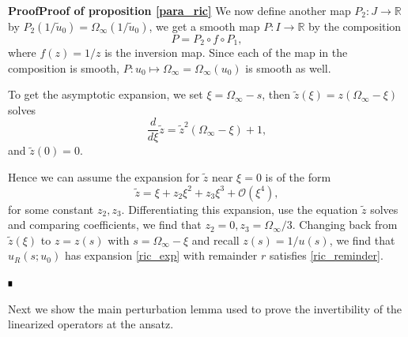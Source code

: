 \documentclass[letterpaper,11pt]{article}
\newcommand{\rmO}{\mathcal{O}}
\numberwithin{equation}{section}
\theoremstyle{plain}
\newenvironment{Proof}[1][.]%
 {\begin{trivlist}\item[]\textbf{Proof#1 }}%
 {\hspace*{\fill}$\rule{0.3\baselineskip}{0.35\baselineskip}$\end{trivlist}}
\begin{document}
\begin{Proof}[\textbf{Proof of proposition \ref{para_ric}}]
 We now define another map $P_2 : J \to \mathbb{R}$ by $P_2(1/\tilde{u}_0) = \Omega_\infty(1/\tilde{u}_0)$, we get a smooth map $P: I \to \mathbb{R}$ by the composition
 \[
 P =P_2 \circ f \circ P_1,
 \] 
 where $f(z) = 1/z$ is the inversion map. Since each of the map in the composition is smooth, $P: u_0 \mapsto \Omega_\infty = \Omega_\infty(u_0)$ is smooth as well.

To get the asymptotic expansion, we set $\xi = \Omega_\infty-s$, then $\tilde{z}(\xi)=z(\Omega_\infty-\xi)$ solves
\[
\frac{d}{d\xi} \tilde{z} = \tilde{z}^2(\Omega_\infty-\xi)+1,
\]
and $\tilde{z}(0) = 0$.

Hence we can assume the expansion for $\tilde{z}$ near $\xi=0$ is of the form
\[
\tilde{z} = \xi + z_2\xi^2+z_3\xi^3 + \rmO(\xi^4),
\]
for some constant $z_2,z_3$. Differentiating this expansion, use the equation $\tilde{z}$ solves and comparing coefficients, we find that $z_2 = 0, z_3 = \Omega_\infty/3$.  Changing back from $\tilde{z}(\xi)$ to $z=z(s)$ with $s = \Omega_\infty-\xi$ and recall $z(s) = 1/u(s)$, we find that $u_R(s;u_0)$ has expansion \eqref{ric_exp} with remainder $r$ satisfies \eqref{ric_reminder}.


\end{Proof}

Next we show the main perturbation lemma used to prove the invertibility of the linearized operators at the ansatz.
\end{document}
